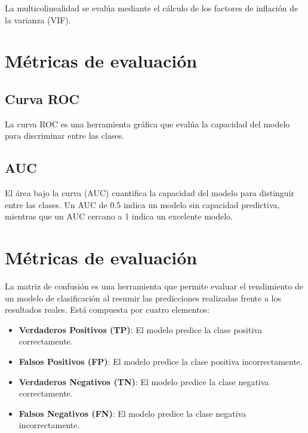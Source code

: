 \documentclass[
  letterpaper,
  DIV=11,
  numbers=noendperiod]{scrreprt}
\providecommand{\tightlist}{%
  \setlength{\itemsep}{0pt}\setlength{\parskip}{0pt}}\usepackage{longtable,booktabs,array}
\begin{document}
La multicolinealidad se evalúa mediante el cálculo de los factores de
inflación de la varianza (VIF).

\section{Métricas de evaluación}\label{muxe9tricas-de-evaluaciuxf3n-2}

\subsection{Curva ROC}\label{curva-roc}

La curva ROC es una herramienta gráfica que evalúa la capacidad del
modelo para discriminar entre las clases.

\subsection{AUC}\label{auc}

El área bajo la curva (AUC) cuantifica la capacidad del modelo para
distinguir entre las clases. Un AUC de 0.5 indica un modelo sin
capacidad predictiva, mientras que un AUC cercano a 1 indica un
excelente modelo.

\section{Métricas de evaluación}\label{muxe9tricas-de-evaluaciuxf3n-3}

La matriz de confusión es una herramienta que permite evaluar el
rendimiento de un modelo de clasificación al resumir las predicciones
realizadas frente a los resultados reales. Está compuesta por cuatro
elementos:

\begin{itemize}
\tightlist
\item
  \textbf{Verdaderos Positivos (TP)}: El modelo predice la clase
  positiva correctamente.
\item
  \textbf{Falsos Positivos (FP)}: El modelo predice la clase positiva
  incorrectamente.
\item
  \textbf{Verdaderos Negativos (TN)}: El modelo predice la clase
  negativa correctamente.
\item
  \textbf{Falsos Negativos (FN)}: El modelo predice la clase negativa
  incorrectamente.
\end{itemize}
\end{document}
